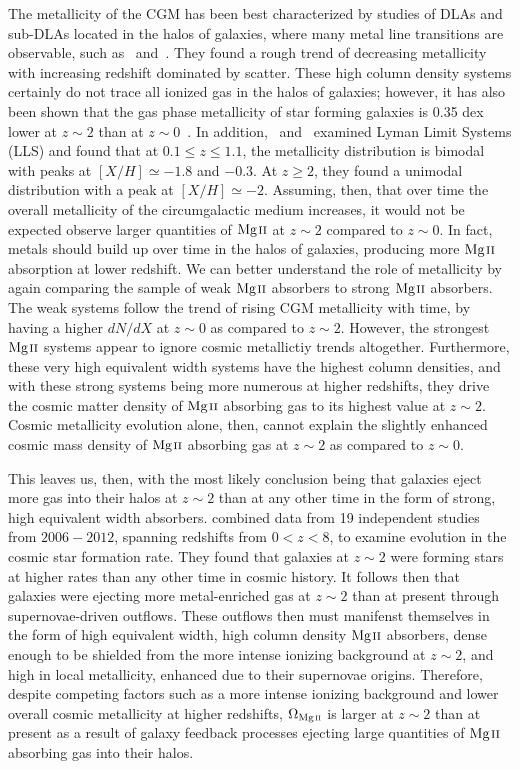 \documentclass[iop,apj,numberedappendix,appendixfloats,twocolappendix]{emulateapj}
\begin{document}
The metallicity of the CGM has been best characterized by studies of DLAs and sub-DLAs located in the halos of galaxies, where many metal line transitions are observable, such as~\cite{Rafelski2012} and~\cite{Quiret2016}. They found a rough trend of decreasing metallicity with increasing redshift dominated by scatter. These high column density systems certainly do not trace all ionized gas in the halos of galaxies; however, it has also been shown that the gas phase metallicity of star forming galaxies is 0.35 dex lower at $z \sim 2$ than at $z \sim 0$~\citep{Yuan2013}. In addition,~\cite{Wotta2016} and~\cite{Lehner2016} examined Lyman Limit Systems (LLS) and found that at $0.1 \le z \le 1.1$, the metallicity distribution is bimodal with peaks at $[X/H] \simeq -1.8$ and $-0.3$. At $z \ge 2$, they found a unimodal distribution with a peak at $[X/H] \simeq -2$. Assuming, then, that over time the overall metallicity of the circumgalactic medium increases, it would not be expected observe larger quantities of ${\hbox{{\rm Mg}\kern 0.1em{\sc ii}}}$ at $z \sim 2$ compared to $z \sim 0$. In fact, metals should build up over time in the halos of galaxies, producing more ${\hbox{{\rm Mg}\kern 0.1em{\sc ii}}}$ absorption at lower redshift. We can better understand the role of metallicity by again comparing the sample of weak ${\hbox{{\rm Mg}\kern 0.1em{\sc ii}}}$ absorbers to strong ${\hbox{{\rm Mg}\kern 0.1em{\sc ii}}}$ absorbers. The weak systems follow the trend of rising CGM metallicity with time, by having a higher $dN\!/dX$ at $z \sim 0$ as compared to $z \sim 2$. However, the strongest ${\hbox{{\rm Mg}\kern 0.1em{\sc ii}}}$ systems appear to ignore cosmic metallictiy trends altogether. Furthermore, these very high equivalent width systems have the highest column densities, and with these strong systems being more numerous at higher redshifts, they drive the cosmic matter density of ${\hbox{{\rm Mg}\kern 0.1em{\sc ii}}}$ absorbing gas to its highest value at $z \sim 2$. Cosmic metallicity evolution alone, then, cannot explain the slightly enhanced cosmic mass density of ${\hbox{{\rm Mg}\kern 0.1em{\sc ii}}}$ absorbing gas at $z \sim 2$ as compared to $z \sim 0$.

This leaves us, then, with the most likely conclusion being that galaxies eject more gas into their halos at $z \sim 2$ than at any other time in the form of strong, high equivalent width absorbers. \cite{Behroozi2013sfr} combined data from 19 independent studies from $2006-2012$, spanning redshifts from $0 < z < 8$, to examine evolution in the cosmic star formation rate. They found that galaxies at $z \sim 2$ were forming stars at higher rates than any other time in cosmic history. It follows then that galaxies were ejecting more metal-enriched gas at $z \sim 2$ than at present through supernovae-driven outflows. These outflows then must manifenst themselves in the form of high equivalent width, high column density ${\hbox{{\rm Mg}\kern 0.1em{\sc ii}}}$ absorbers, dense enough to be shielded from the more intense ionizing background at $z \sim 2$, and high in local metallicity, enhanced due to their supernovae origins. Therefore, despite competing factors such as a more intense ionizing background and lower overall cosmic metallicity at higher redshifts, $\Omega_{\hbox{\scriptsize {\MgII}}}$ is larger at $z \sim 2$ than at present as a result of galaxy feedback processes ejecting large quantities of ${\hbox{{\rm Mg}\kern 0.1em{\sc ii}}}$ absorbing gas into their halos. 
\end{document}
